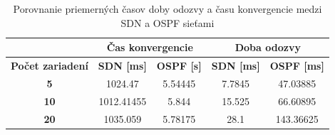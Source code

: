 \documentclass[conference]{IEEEtran}
\begin{document}
\begin{table}[h!]
\centering
\caption{Porovnanie priemerných časov doby odozvy a času konvergencie medzi SDN a OSPF sieťami}
\label{my-label}
\begin{tabular}{|c|c|c|c|c|}
\hline
                         & \multicolumn{2}{c|}{\textbf{Čas konvergencie}} & \multicolumn{2}{c|}{\textbf{Doba odozvy}}      \\ \hline
\textbf{Počet zariadení} & \textbf{SDN {[}ms{]}}  & \textbf{OSPF {[}s{]}} & \textbf{SDN {[}ms{]}} & \textbf{OSPF {[}ms{]}} \\ \hline
\textbf{5}               & 1024.47                & 5.54445               & 7.7845                & 47.03885               \\ \hline
\textbf{10}              & 1012.41455             & 5.844                 & 15.525                & 66.60895               \\ \hline
\textbf{20}              & 1035.059               & 5.78175               & 28.1                  & 143.36625              \\ \hline
\end{tabular}
\end{table}





\ifCLASSOPTIONcaptionsoff
  \newpage
\fi
\end{document}
